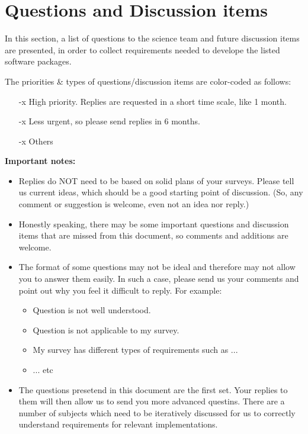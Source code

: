 \documentclass[a4paper,notitlepage]{article}
\newcommand{\cols}[1]{\textcolor{ccols}{\thesubsubsection-#1}}
\newcommand{\colm}[1]{\textcolor{ccolm}{\thesubsubsection-#1}}
\newcommand{\coll}[1]{\textcolor{ccoll}{\thesubsubsection-#1}}
\begin{document}
\section{Questions and Discussion items}

In this section, a list of questions to the science team and future
discussion items are presented, in order to collect requirements needed
to develope the listed software packages.

The priorities \& types of questions/discussion items are color-coded as
follows:
\begin{enumerate}
  \item[\colm{x}] High priority. Replies are requested in a short time
           scale, like 1 month.
  \item[\cols{x}] Less urgent, so please send replies in 6 months.
  \item[\coll{x}] Others
\end{enumerate}

{\bf Important notes:}
\begin{itemize}
 \item Replies do NOT need to be based on solid plans of your
   surveys. Please tell us current ideas, which should be a good
   starting point of discussion.
       (So, any comment or suggestion is welcome, even not an idea nor reply.) 
 \item Honestly speaking, there may be some important questions and
       discussion items that are missed from this document, so comments
       and additions are welcome.
 \item The format of some questions may not be ideal and therefore may
       not allow you to answer them easily. In such a case, please send
       us your comments and point out why you feel it difficult to
       reply. For example:
       \begin{itemize}
    \item Question is not well understood.
    \item Question is not applicable to my survey.
    \item My survey has different types of requirements such as ... 
    \item ... etc
       \end{itemize}
 \item The questions presetend in this document are the first
   set. Your replies to them will then allow us to send you more
   advanced questins. There are a number of subjects which need to be
   iteratively discussed for us to correctly understand requirements
   for relevant implementations.
\end{itemize}
\end{document}
